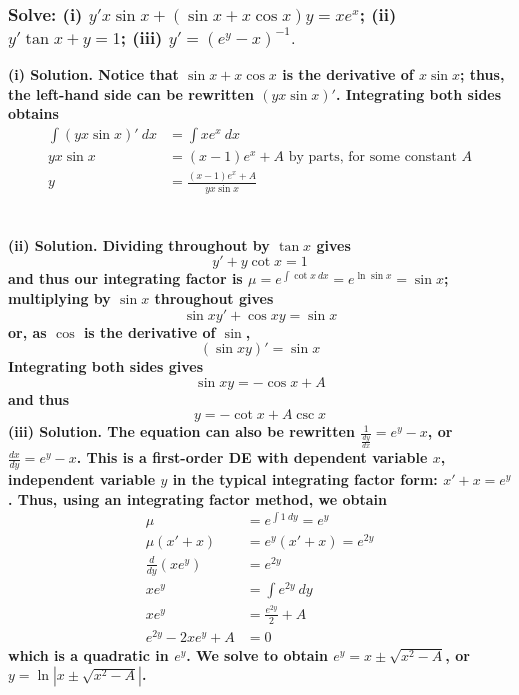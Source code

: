 \documentclass{article}
\begin{document}
\hrulefill
\subsubsection*{Solve: (i) $y'x \sin x + (\sin x + x \cos x)y = xe^x$; (ii) $y'\tan x + y = 1$; (iii) $y' = (e^y - x)^{-1}.$}
\bf (i) Solution. \normalfont Notice that $\sin x + x \cos x$ is the derivative of $x \sin x$; thus, the left-hand side can be rewritten $(y x \sin x)'$. Integrating both sides obtains
\begin{equation*}
    \begin{aligned}
        \int (y x \sin x)'\ dx &= \int x e^x\ dx \\
        yx \sin x &= (x-1)e^x + A \text{ by parts, for some constant $A$} \\
        y &= \frac{(x-1)e^x + A}{yx\sin x}
    \end{aligned}
\end{equation*}
\\ \\
\bf(ii) Solution. \normalfont Dividing throughout by $\tan x$ gives
\begin{equation*}
    y' + y \cot x = 1
\end{equation*}
and thus our integrating factor is $\mu = e^{\int \cot x \ dx} = e^{\ln \sin x} = \sin x$; multiplying by $\sin x$ throughout gives
\begin{equation*}
    \sin x y' + \cos x y = \sin x
\end{equation*}
or, as $\cos$ is the derivative of $\sin$,
\begin{equation*}
    (\sin x y)' = \sin x
\end{equation*}
Integrating both sides gives
\begin{equation*}
    \sin x y = - \cos x + A
\end{equation*}
and thus
\begin{equation*}
    y = -\cot x + A \csc x
\end{equation*}
\bf (iii) Solution. \normalfont The equation can also be rewritten $\frac{1}{\frac{dy}{dx}} = e^y - x$, or $\frac{dx}{dy}=e^y-x$. This is a first-order DE with dependent variable $x$, independent variable $y$ in the typical integrating factor form: $x' + x = e^y$. Thus, using an integrating factor method, we obtain
\begin{equation*}
    \begin{aligned}
        \mu &= e^{\int 1\ dy} = e^y \\
        \mu(x'+x) &= e^y(x' + x) = e^{2y} \\
        \frac{d}{dy}(x e^y) &= e^{2y} \\
        x e^y &= \int e^{2y}\ dy \\
        x e^y &= \frac{e^{2y}}{2} + A \\
        e^{2y} - 2xe^y + A &= 0
    \end{aligned}
\end{equation*}
which is a quadratic in $e^y$. We solve to obtain $e^y = x \pm \sqrt{x^2 - A}$, or $y = \ln |x \pm \sqrt{x^2 - A}|$.
\hrulefill
\end{document}
